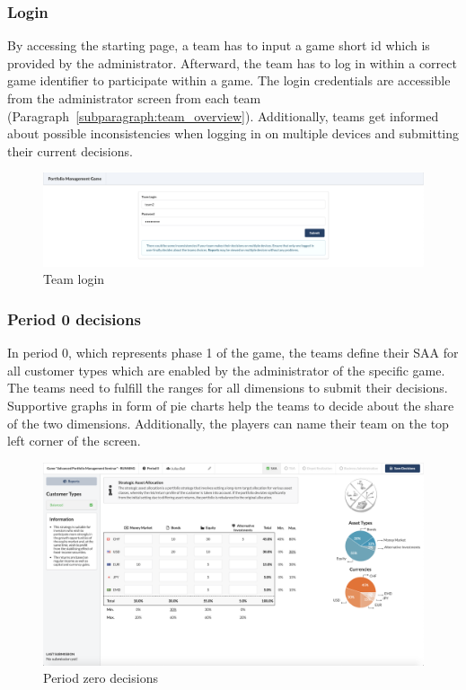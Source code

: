 \subsubsection{Login}
By accessing the starting page, a team has to input a game short id which is provided by the administrator. Afterward, the team has to log in within a correct game identifier to participate within a game. The login credentials are accessible from the administrator screen from each team (Paragraph~\ref{subparagraph:team_overview}). Additionally, teams get informed about possible inconsistencies when logging in on multiple devices and submitting their current decisions.
\begin{figure}[h!]
  \centering
  \includegraphics[scale=0.2]{img/application-overview/teams/01_login.png}
  \caption{Team login}
\end{figure}

\subsubsection{Period 0 decisions}
In period 0, which represents phase 1 of the game, the teams define their SAA for all customer types which are enabled by the administrator of the specific game. The teams need to fulfill the ranges for all dimensions to submit their decisions. Supportive graphs in form of pie charts help the teams to decide about the share of the two dimensions. Additionally, the players can name their team on the top left corner of the screen.
\begin{figure}[h!]
  \centering
  \includegraphics[scale=0.2]{img/application-overview/teams/02_period_zero_decisions.png}
  \caption{Period zero decisions}
\end{figure}


